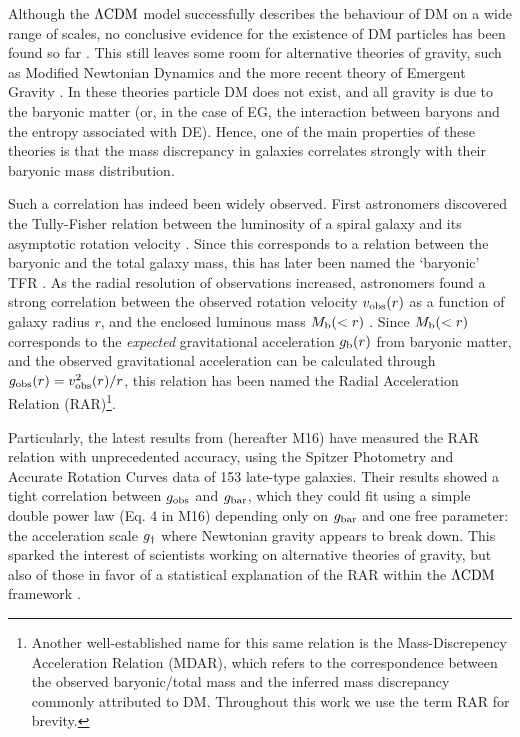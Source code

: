 \documentclass[usenatbib]{mnras}
\newcommand{\lcdm}{{\rm \Lambda CDM}}
\newcommand{\un}[1]{_{\rm #1}}
\begin{document}
Although the $\lcdm$ model successfully describes the behaviour of DM on a wide range of scales, no conclusive evidence for the existence of DM particles has been found so far \cite[despite years of enormous effort; for an overview, see][]{bertone2005,bertone2018}. This still leaves some room for alternative theories of gravity, such as Modified Newtonian Dynamics  \cite[MOND,][]{milgrom1983} and the more recent theory of Emergent Gravity \cite[EG,][]{verlinde2016}. In these theories particle DM does not exist, and all gravity is due to the baryonic matter (or, in the case of EG, the interaction between baryons and the entropy associated with DE). Hence, one of the main properties of these theories is that the mass discrepancy in galaxies correlates strongly with their baryonic mass distribution.

Such a correlation has indeed been widely observed. First astronomers discovered the Tully-Fisher relation \cite[TFR,][]{tully1977} between the luminosity of a spiral galaxy and its asymptotic rotation velocity \cite[]{pierce1988,bernstein1994}. Since this corresponds to a relation between the baryonic and the total galaxy mass, this has later been named the `baryonic' TFR \cite[BTFR,][]{mcgaugh2000,mcgaugh2012}. As the radial resolution of observations increased, astronomers found a strong correlation between the observed rotation velocity $v\un{obs}(r)$ as a function of galaxy radius $r$, and the enclosed luminous mass \mbox{$M\un{b}(<r)$} \cite[]{sanders1986,sanders1996,mcgaugh2004,sanders2007,wu2015}. Since $M\un{b}(<r)$ corresponds to the \emph{expected} gravitational acceleration $g\un{b}(r)$ from baryonic matter, and the observed gravitational acceleration can be calculated through $g\un{obs}(r)=v\un{obs}^2(r)/r$, this relation has been named the Radial Acceleration Relation (RAR)\footnote{Another well-established name for this same relation is the Mass-Discrepency Acceleration Relation (MDAR), which refers to the correspondence between the observed baryonic/total mass and the inferred mass discrepancy commonly attributed to DM. Throughout this work we use the term RAR for brevity.}.

Particularly, the latest results from \cite{mcgaugh2016} (hereafter M16) have measured the RAR relation with unprecedented accuracy, using the Spitzer Photometry and Accurate Rotation Curves \cite[SPARC,][]{lelli2016b} data of 153 late-type galaxies. Their results showed a tight correlation between $g\un{obs}$ and $g\un{bar}$, which they could fit using a simple double power law (Eq. 4 in M16) depending only on $g\un{bar}$ and one free parameter: the acceleration scale $g\un{\dagger}$ where Newtonian gravity appears to break down. This sparked the interest of scientists working on alternative theories of gravity, but also of those in favor of a statistical explanation of the RAR within the $\lcdm$ framework \cite[]{keller2017,desmond2017,ludlow2017}.
\end{document}
